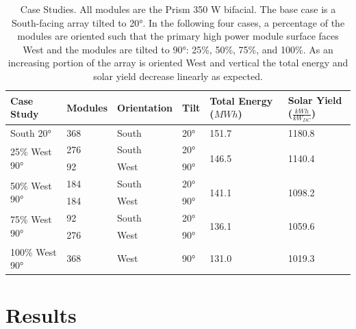 \documentclass[journal,article,submit,pdftex,moreauthors]{Definitions/mdpi}
\begin{document}
\begin{table}
  \centering
  \caption{Case Studies. All modules are the Prism 350 W bifacial. The base case is a South-facing array tilted to 20°. In the following four cases, a percentage of the modules are oriented such that the primary high power module surface faces West and the modules are tilted to 90°: 25\%, 50\%, 75\%, and 100\%. As an increasing portion of the array is oriented West and vertical the total energy and solar yield decrease linearly as expected.}
  \label{tab:casestudies}
  \begin{tabularx}{\textwidth}{XXXXXX}
    \toprule
    Case Study                     & Modules & Orientation & Tilt & Total Energy ($MWh$)   & Solar Yield ($\frac{kWh}{kW_{DC}}$) \\
    \midrule
    South 20°                      & 368     & South       & 20°  & 151.7                  & 1180.8                              \\
    \hline
    \multirow{2}{*}{25\% West 90°} & 276     & South       & 20°  & \multirow{2}{*}{146.5} & \multirow{2}{*}{1140.4}             \\
                                   & 92      & West        & 90°  &                        &                                     \\
    \hline
    \multirow{2}{*}{50\% West 90°} & 184     & South       & 20°  & \multirow{2}{*}{141.1} & \multirow{2}{*}{1098.2}             \\
                                   & 184     & West        & 90°  &                        &                                     \\
    \hline
    \multirow{2}{*}{75\% West 90°} & 92      & South       & 20°  & \multirow{2}{*}{136.1} & \multirow{2}{*}{1059.6}             \\
                                   & 276     & West        & 90°  &                        &                                     \\
    \hline
    100\% West 90°                 & 368     & West        & 90°  & 131.0                  & 1019.3                              \\
    \bottomrule
  \end{tabularx}
\end{table}

\section{Results}\label{results}%
\end{document}
